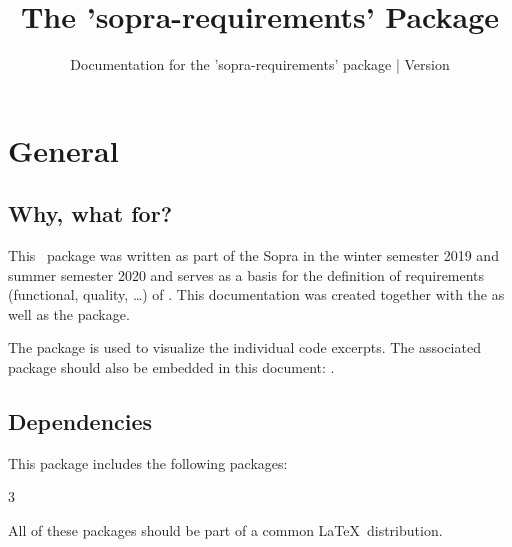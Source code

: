 \documentclass{sopra-base}
\title{The 'sopra-requirements' Package}
\subtitle[Documentation for the 'sopra-requirements' package]{Documentation for the 'sopra-requirements' package | Version \thesorversion}
\begin{document}
    \maketitle%
%
%

\section{General}
\subsection{Why, what for?}
    This \LaTeXe\ package was written as part of the Sopra in the
    winter semester 2019 and summer semester 2020 and serves as a
    basis for the definition of requirements (functional, quality, \ldots)
    of . This documentation was created together with the
     as well as the  package.\par
    The  package is used to visualize the individual code
    excerpts.
    The associated package should also be embedded in this document: .
\subsection{Dependencies}
    This package includes the following packages:
    \begin{multicols}{3}
    \end{multicols}
    All of these packages should be part of a common \LaTeX\ distribution.
\end{document}

